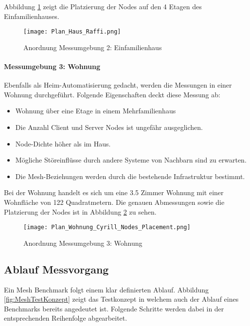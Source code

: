 Abbildung \ref{fig:Messumgebung2Einfamilienhaus} zeigt die Platzierung der Nodes auf den 4 Etagen des Einfamilienhauses.

\begin{figure}[H]
	\centering
	\texttt{[image: Plan\_Haus\_Raffi.png]}
	\caption{Anordnung Messumgebung 2: Einfamilienhaus}\label{fig:Messumgebung2Einfamilienhaus}
\end{figure}
	
\paragraph{Messumgebung 3: Wohnung}
Ebenfalls als Heim-Automatisierung gedacht, werden die Messungen in einer Wohnung durchgeführt.
Folgende Eigenschaften deckt diese Messung ab:
\begin{itemize}
	\item Wohnung über eine Etage in einem Mehrfamilienhaus
	\item Die Anzahl Client und Server Nodes ist ungefähr ausgeglichen.
	\item Node-Dichte höher als im Haus.
	\item Mögliche Störeinflüsse durch andere Systeme von Nachbarn sind zu erwarten.
	\item Die Mesh-Beziehungen werden durch die bestehende Infrastruktur bestimmt.
\end{itemize}

Bei der Wohnung handelt es sich um eine 3.5 Zimmer Wohnung mit einer Wohnfläche von 122 Quadratmetern. Die genauen Abmessungen sowie die Platzierung der Nodes ist in Abbildung \ref{fig:PlatzierungderNodesinMessumgebung3} zu sehen.

\begin{figure}[H]
	\centering
	\texttt{[image: Plan\_Wohnung\_Cyrill\_Nodes\_Placement.png]}
	\caption{Anordnung Messumgebung 3: Wohnung}\label{fig:PlatzierungderNodesinMessumgebung3}
\end{figure}


\subsection{Ablauf Messvorgang}\label{subsec:AblaufMesh}
Ein Mesh Benchmark folgt einem klar definierten Ablauf. Abbildung \ref{fig:MeshTestKonzept} zeigt das Testkonzept in welchem auch der Ablauf eines Benchmarks bereits angedeutet ist.
Folgende Schritte werden dabei in der entsprechenden Reihenfolge abgearbeitet.

